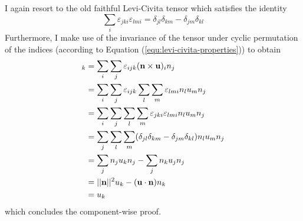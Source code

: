 \documentclass[11pt, a4paper]{article}
\begin{document}
I again resort to the old faithful Levi-Civita tensor which satisfies the
identity
\begin{equation}
    \sum_i \varepsilon_{jki} \varepsilon_{lmi} = \delta_{jl} \delta_{km} - \delta_{jm} \delta_{kl}
\end{equation}
Furthermore, I make use of the invariance of the tensor under cyclic permutation
of the indices (according to Equation (\ref{equ:levi-civita-properties})) to obtain
\begin{align}
    [(\mathbf{n} \times \mathbf{u}) \times \mathbf{n}]_k
    &= \sum_i \sum_j \varepsilon_{ijk} (\mathbf{n} \times \mathbf{u})_i n_j \notag \\ 
    &= \sum_i \sum_j \varepsilon_{ijk} \sum_l \sum_m \varepsilon_{lmi} n_l u_m n_j \notag \\ 
    &= \sum_i \sum_j \sum_l \sum_m \varepsilon_{jki} \varepsilon_{lmi} n_l u_m n_j \notag \\ 
    &= \sum_j \sum_l \sum_m (\delta_{jl} \delta_{km} - \delta_{jm} \delta_{kl}) n_l u_m n_j \notag \\
    &= \sum_j n_j u_k n_j - \sum_j n_k u_j n_j \notag \\
    &= ||\mathbf{n}||^2 u_k - (\mathbf{u} \cdot \mathbf{n}) n_k \notag \\ 
    &= u_k
\end{align}
which concludes the component-wise proof.
\end{document}
